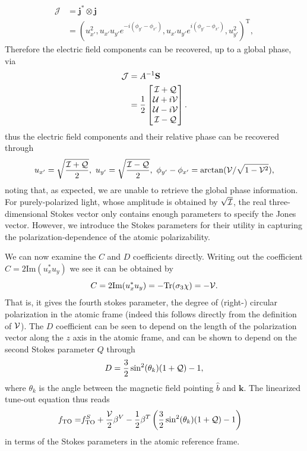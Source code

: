 	\begin{align}
		\mathcal{J} &= \mathbf{j}^*\otimes\mathbf{j}\\
					&= (u_{x'}^2,u_{x'}u_{y'}e^{-i(\phi_{y'}-\phi_{x'})},u_{x'}u_{y'}e^{i(\phi_{y'}-\phi_{x'})},u_{y'}^2)^\mathrm{T},
	\end{align}
	Therefore the electric field components can be recovered, up to a global phase, via
	\begin{align}
		 \mathcal{J} &= A^{-1} \mathbf{S}\\
					 &= \frac{1}{2}\begin{bmatrix} 
					 				\mathcal{I}+\mathcal{Q}\\\mathcal{U}+i\mathcal{V}\\\mathcal{U}-i\mathcal{V}\\\mathcal{I}-\mathcal{Q}
								 	\end{bmatrix}.
	\end{align}
	thus the electric field components and their relative phase can be recovered through
	\begin{equation}
		 u_{x'} = \sqrt{\frac{\mathcal{I}+\mathcal{Q}}{2}},~u_{y'} = \sqrt{\frac{\mathcal{I}-\mathcal{Q}}{2}},~\phi_{y'}-\phi_{x'} = \mathrm{arctan}(\mathcal{V}/\sqrt{1-\mathcal{V}^2}),
	\end{equation}
	noting that, as expected, we are unable to retrieve the global phase information. For purely-polarized light, whose amplitude is obtained by $\sqrt{\mathcal{I}}$, the real three-dimensional Stokes vector only contains enough parameters to specify the Jones vector. 
	However, we introduce the Stokes parameters for their utility in capturing the polarization-dependence of the atomic polarizability.


	We can now examine the $C$ and $D$ coefficients directly.
	Writing out the coefficient $C=2\mathrm{Im}(u_{x}^*u_y)$ we see it can be obtained by 
	\begin{equation}
	C=2\mathrm{Im}(u_{x}^*u_y) = -\mathrm{Tr}(\sigma_3\chi) = -\mathcal{V}.
	\end{equation}
	That is, it gives the fourth stokes parameter, the degree of (right-) circular polarization in the atomic frame (indeed this follows directly from the definition of $\mathcal{V}$).
	The $D$ coefficient can be seen to depend on the length of the polarization vector along the $z$ axis in the atomic frame, and can be shown \cite{Henson22} to depend on the second Stokes parameter $Q$ through
	\begin{equation}
		D = \frac{3}{2}\sin^2(\theta_k)(1+\mathcal{Q}) - 1,
	\end{equation}
	where $\theta_k$ is the angle between the magnetic field pointing $\hat{b}$ and $\mathbf{k}$.
	The linearized tune-out equation thus reads
	\begin{align}
		 f_\mathrm{TO} = & f_\mathrm{TO}^S + \frac{\mathcal{V}}{2}\beta^V - \frac{1}{2}\beta^T \left(\frac{3}{2}\sin^2(\theta_k)(1+\mathcal{Q}) - 1\right)
		 \label{eqn:fto_stokes_eqn}
	\end{align}
	in terms of the Stokes parameters in the atomic reference frame. 

